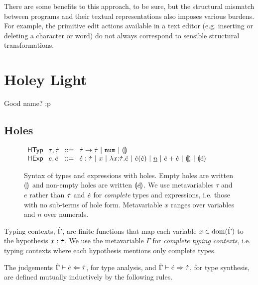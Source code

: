\documentclass{llncs}
\begin{document}
There are some benefits to this approach, to be sure, but the structural mismatch between programs and their textual representations  also imposes various burdens. 
For example, the primitive edit actions available in a text editor (e.g. inserting or deleting a character or word)  do not always correspond to  sensible structural transformations. 




\section{Holey Light}
Good name? :p
\subsection{Holes}
\begin{figure}
$\arraycolsep=4pt\begin{array}{lllllll}
\mathsf{HTyp} & \tau,\htau & ::= & 
  \tarr{\htau}{\htau} ~\vert~ 
  \tnum ~\vert~
  \tehole\\
\mathsf{HExp} & e,\hexp & ::= & 
  \hexp : \htau ~\vert~
  x ~\vert~ 
  \hlam{x}{\htau}{\hexp} ~\vert~ 
  \hap{\hexp}{\hexp} ~\vert~
  \hnum{n} ~\vert~
  \hadd{\hexp}{\hexp} ~\vert~
  \hehole ~\vert~
  \hhole{\hexp}
\end{array}$
\caption{Syntax of types and expressions with holes. Empty holes are written $\llparenthesis\rrparenthesis$ and non-empty holes are written $\llparenthesis\dot{e}\rrparenthesis$. We use metavariables $\tau$ and $e$ rather than $\dot{\tau}$ and $\dot{e}$ for \emph{complete} types and expressions, i.e. those with no sub-terms of hole form. Metavariable $x$ ranges over variables and $n$ over numerals.}
\label{fig:hexp-syntax}
\end{figure}

Typing contexts, $\dot{\Gamma}$, are finite functions that map each variable $x \in \text{dom}(\dot{\Gamma})$ to the hypothesis $x : \dot{\tau}$. We use the metavariable $\Gamma$ for \emph{complete typing contexts}, i.e. typing contexts where each hypothesis mentions only complete types.

The judgements $\dot{\Gamma} \vdash \dot{e} \Leftarrow \dot{\tau}$, for type analysis, and $\dot{\Gamma} \vdash \dot{e} \Rightarrow \dot{\tau}$, for type synthesis, are defined mutually inductively by the following rules.
\end{document}
